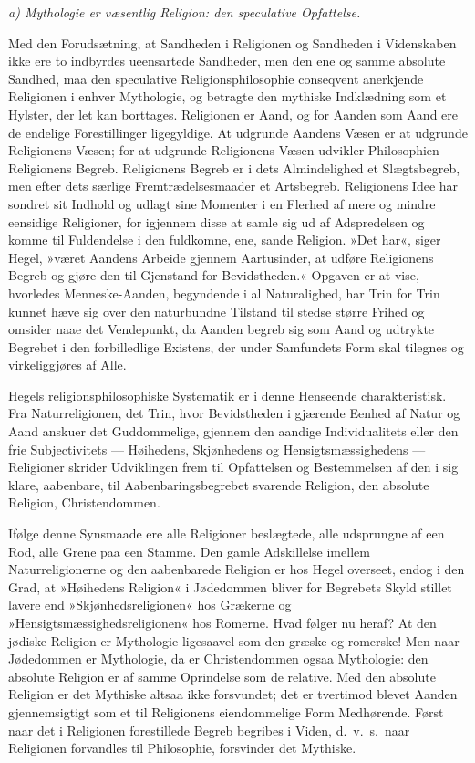 \documentclass[12pt,a4paper]{article}
\begin{document}
\medskip

\noindent\textit{a) Mythologie er væsentlig Religion: den speculative Opfattelse.}

\medskip

Med den Forudsætning, at Sandheden i Religionen og Sandheden i
Videnskaben ikke ere to indbyrdes ueensartede Sandheder, men
den ene og samme absolute Sandhed, maa den speculative
Religionsphilosophie conseqvent anerkjende Religionen i enhver
Mythologie, og betragte den mythiske Indklædning som et Hylster,
der let kan borttages. Religionen er Aand, og for Aanden som
Aand ere de endelige Forestillinger ligegyldige. At udgrunde
Aandens Væsen er at udgrunde Religionens Væsen; for at udgrunde
Religionens Væsen udvikler Philosophien Religionens Begreb.
Religionens Begreb er i dets Almindelighed et Slægtsbegreb, men
efter dets særlige Fremtrædelsesmaader et Artsbegreb.
Religionens Idee har sondret sit Indhold og udlagt sine Momenter
i en Flerhed af mere og mindre eensidige Religioner, for
igjennem disse at samle sig ud af Adspredelsen og komme til
Fuldendelse i den fuldkomne, ene, sande Religion. »Det har«,
siger Hegel, »været Aandens Arbeide gjennem Aartusinder, at
udføre Religionens Begreb og gjøre den til Gjenstand for
Bevidstheden.« Opgaven er at vise, hvorledes Menneske-Aanden,
begyndende i al Naturalighed, har Trin for Trin kunnet hæve sig
over den naturbundne Tilstand til stedse større Frihed og
omsider naae det Vendepunkt, da Aanden begreb sig som Aand og
udtrykte Begrebet i den forbilledlige Existens, der under
Samfundets Form skal tilegnes og virkeliggjøres af Alle.

Hegels religionsphilosophiske Systematik er i denne Henseende
charakteristisk. Fra Naturreligionen, det Trin, hvor
Bevidstheden i gjærende Eenhed af Natur og Aand anskuer det
Guddommelige, gjennem den aandige Individualitets eller den
frie Subjectivitets --- Høihedens, Skjønhedens og
Hensigtsmæssighedens --- Religioner skrider Udviklingen frem til
Opfattelsen og Bestemmelsen af den i sig klare, aabenbare, til
Aabenbaringsbegrebet svarende Religion, den absolute Religion,
Christendommen.

Ifølge denne Synsmaade ere alle Religioner beslægtede, alle
udsprungne af een Rod, alle Grene paa een Stamme. Den gamle
Adskillelse imellem Naturreligionerne og den aabenbarede
Religion er hos Hegel overseet, endog i den Grad, at
»Høihedens Religion« i Jødedommen bliver for Begrebets Skyld
stillet lavere end »Skjønhedsreligionen« hos Grækerne og
»Hensigtsmæssighedsreligionen« hos Romerne. Hvad følger nu
heraf? At den jødiske Religion er Mythologie ligesaavel som den
græske og romerske! Men naar Jødedommen er Mythologie, da er
Christendommen ogsaa Mythologie: den absolute Religion er af
samme Oprindelse som de relative. Med den absolute Religion er
det Mythiske altsaa ikke forsvundet; det er tvertimod blevet
Aanden gjennemsigtigt som et til Religionens eiendommelige Form
Medhørende. Først naar det i Religionen forestillede Begreb
begribes i Viden, d.\ v.\ s.\ naar Religionen forvandles til
Philosophie, forsvinder det Mythiske.
\end{document}
